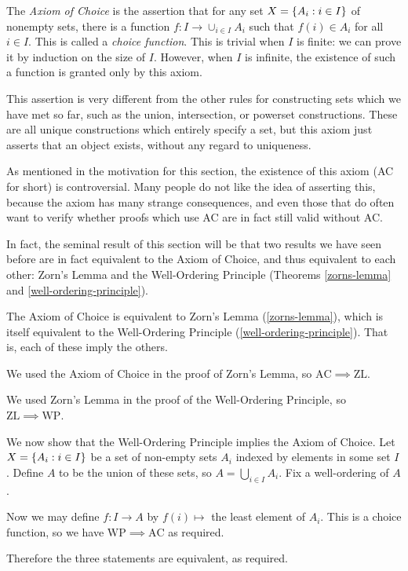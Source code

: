 \documentclass{article}
\begin{document}
The \textit{Axiom of Choice} is the assertion that for any set $X = \left\lbrace A_i : i \in I \right\rbrace$ of nonempty sets, there is a function $f : I \to \cup_{i \in I} A_i$ such that $f(i) \in A_i$ for all $i \in I$. This is called a \textit{choice function}. This is trivial when $I$ is finite: we can prove it by induction on the size of $I$. However, when $I$ is infinite, the existence of such a function is granted only by this axiom.

\begin{note}
	This assertion is very different from the other rules for constructing sets which we have met so far, such as the union, intersection, or powerset constructions. These are all unique constructions which entirely specify a set, but this axiom just asserts that an object exists, without any regard to uniqueness.
\end{note}

\begin{note}
	As mentioned in the motivation for this section, the existence of this axiom (AC for short) is controversial. Many people do not like the idea of asserting this, because the axiom has many strange consequences, and even those that do often want to verify whether proofs which use AC are in fact still valid without AC.
\end{note}

In fact, the seminal result of this section will be that two results we have seen before are in fact equivalent to the Axiom of Choice, and thus equivalent to each other: Zorn's Lemma and the Well-Ordering Principle (Theorems \ref{zorns-lemma} and \ref{well-ordering-principle}).

\begin{theorem}
	\label{ac-zl-wop}
    The Axiom of Choice is equivalent to Zorn's Lemma (\ref{zorns-lemma}), which is itself equivalent to the Well-Ordering Principle (\ref{well-ordering-principle}). That is, each of these imply the others.
\end{theorem}

\begin{prf}
    We used the Axiom of Choice in the proof of Zorn's Lemma, so $\mathrm{AC} \implies \mathrm{ZL}$.
    
    We used Zorn's Lemma in the proof of the Well-Ordering Principle, so $\mathrm{ZL} \implies \mathrm{WP}$.
    
    We now show that the Well-Ordering Principle implies the Axiom of Choice. Let $X = \left\lbrace A_i : i \in I \right\rbrace$ be a set of non-empty sets $A_i$ indexed by elements in some set $I$. Define $A$ to be the union of these sets, so $A = \bigcup_{i \in I} A_i$. Fix a well-ordering of $A$.
    
    Now we may define $f : I \to A$ by $f(i) \mapsto$ the least element of $A_i$. This is a choice function, so we have $\mathrm{WP} \implies \mathrm{AC}$ as required.
    
    Therefore the three statements are equivalent, as required.
\end{prf}
\end{document}
